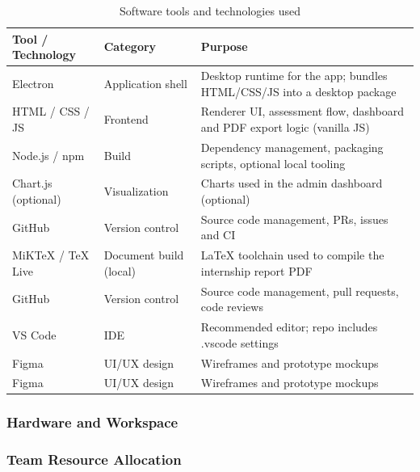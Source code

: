 ﻿\documentclass[12pt, a4paper]{article}
\newcommand{\theadrow}{\rowcolor{tableheader}}
\newcommand{\rowalt}{\rowcolor{tablerowalt}}
\begin{document}
\begin{table}[H]
\centering
\begin{tabularx}{\textwidth}{p{3cm}p{3cm}X}
\toprule
\theadrow
\textbf{Tool / Technology} & \textbf{Category} & \textbf{Purpose} \\
\midrule
Electron           & Application shell      & Desktop runtime for the app; bundles HTML/CSS/JS into a desktop package \\[3pt]
\rowalt
HTML / CSS / JS    & Frontend               & Renderer UI, assessment flow, dashboard and PDF export logic (vanilla JS) \\[3pt]
Node.js / npm      & Build & Dependency management, packaging scripts, optional local tooling \\[3pt]
\rowalt
Chart.js (optional)& Visualization          & Charts used in the admin dashboard (optional) \\[3pt]
GitHub             & Version control        & Source code management, PRs, issues and CI \\[3pt]
\rowalt
MiKTeX / TeX Live   & Document build (local) & LaTeX toolchain used to compile the internship report PDF \\[3pt]
GitHub            & Version control      & Source code management, pull requests, code reviews \\[3pt]
\rowalt
VS Code            & IDE                    & Recommended editor; repo includes .vscode settings \\[3pt]
Figma              & UI/UX design           & Wireframes and prototype mockups \\[3pt]
\rowalt
Figma             & UI/UX design         & Wireframes and prototype mockups \\
\bottomrule
\end{tabularx}
\caption{Software tools and technologies used}
\end{table}

\subsubsection*{Hardware and Workspace}



\subsubsection*{Team Resource Allocation}
\end{document}
